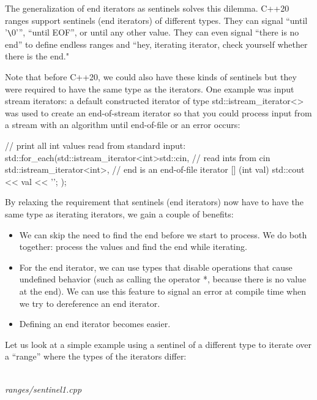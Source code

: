 The generalization of end iterators as sentinels solves this dilemma. C++20 ranges support sentinels (end iterators) of different types. They can signal “until ’\verb|\|0’”, “until EOF”, or until any other value. They can even signal “there is no end” to define endless ranges and “hey, iterating iterator, check yourself whether there is the end."

Note that before C++20, we could also have these kinds of sentinels but they were required to have the same type as the iterators. One example was input stream iterators: a default constructed iterator of type std::istream\_iterator<> was used to create an end-of-stream iterator so that you could process input from a stream with an algorithm until end-of-file or an error occurs:

\begin{cpp}
// print all int values read from standard input:
std::for_each(std::istream_iterator<int>{std::cin}, // read ints from cin
		std::istream_iterator<int>{}, // end is an end-of-file iterator
		[] (int val) {
			std::cout << val << '\n';
		});
\end{cpp}

By relaxing the requirement that sentinels (end iterators) now have to have the same type as iterating iterators, we gain a couple of benefits:

\begin{itemize}
\item
We can skip the need to find the end before we start to process. We do both together: process the values and find the end while iterating.

\item
For the end iterator, we can use types that disable operations that cause undefined behavior (such as calling the operator *, because there is no value at the end). We can use this feature to signal an error at compile time when we try to dereference an end iterator.

\item
Defining an end iterator becomes easier.
\end{itemize}

Let us look at a simple example using a sentinel of a different type to iterate over a “range” where the types of the iterators differ:

\noindent
\hspace*{\fill} \\ %
\textit{ranges/sentinel1.cpp}

